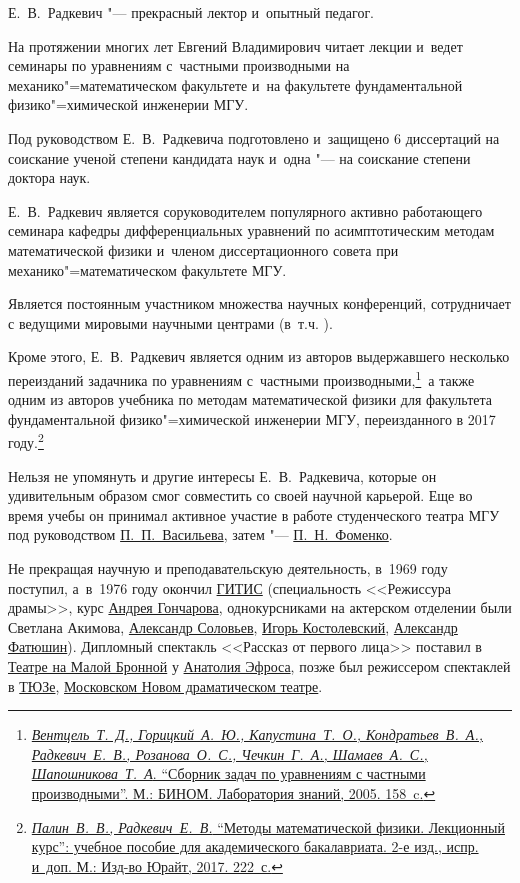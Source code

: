 Е.~В.~Радкевич "--- прекрасный лектор и~опытный педагог. 

На протяжении многих лет Евгений Владимирович читает лекции и~ведет семинары по уравнениям с~частными производными на механико"=математическом факультете и~на факультете фундаментальной физико"=химической инженерии МГУ. 

Под руководством Е.~В.~Радкевича подготовлено и~защищено 6 диссертаций на соискание ученой степени кандидата наук и~одна "--- на соискание степени доктора наук.



Е.~В.~Радкевич является соруководителем популярного активно работающего семинара кафедры дифференциальных уравнений по асимптотическим методам математической физики и~членом диссертационного совета при механико"=математическом факультете МГУ. 

Является постоянным участником множества научных конференций, сотрудничает с ведущими мировыми научными центрами (в~т.ч. ). 

Кроме этого, Е.~В.~Радкевич является одним из авторов выдержавшего несколько переизданий задачника по уравнениям с~частными производными,\footnote{\href{https://istina.msu.ru/publications/book/1826310/}{{\it Вентцель~Т.~Д., Горицкий~А.~Ю., Капустина~Т.~О., Кондратьев~В.~А., Радкевич~Е.~В., Розанова~О.~С., Чечкин~Г.~А., Шамаев~А.~С., Шапошникова~Т.~А}. ``Сборник задач по уравнениям с частными производными''. М.: БИНОМ. Лаборатория знаний, 2005. 158~c.}}\!\!~а также одним из авторов учебника по методам математической физики для факультета фундаментальной физико"=химической инженерии МГУ, переизданного в 2017 году.\footnote{

\href{https://elibrary.ru/item.asp?id=30568002}{{\it Палин~В.~В., Радкевич~Е.~В.} ``Методы математической физики. Лекционный курс'': учебное пособие для академического бакалавриата. 2-е изд., испр. и~доп. М.: Изд-во Юрайт, 2017.  222~с.} }



Нельзя не упомянуть и другие интересы Е.~В.~Радкевича, которые он удивительным образом смог совместить со своей научной карьерой. Еще во время учебы он принимал активное участие в работе студенческого театра МГУ под руководством \href{https://goo.gl/YhM9Eg}{П.~П.~Васильева}, затем "--- \href{https://goo.gl/nB1LPU}{П.~Н.~Фоменко}. 

Не прекращая научную и преподавательскую деятельность, в~1969 году поступил, а~в~1976 году окончил \href{https://goo.gl/DfcJNR}{ГИТИС} (специальность <<Режиссура драмы>>, курс \href{https://goo.gl/HFRLHQ}{Андрея Гончарова}, однокурсниками на актерском отделении были Светлана Акимова, \href{https://goo.gl/a8g3Xm}{Александр Соловьев}, \href{https://goo.gl/VRGfi6}{Игорь Костолевский}, \href{https://goo.gl/oQ89tw}{Александр Фатюшин}). Дипломный спектакль <<Рассказ от первого лица>> поставил в \href{https://goo.gl/mvSV2b}{Театре на Малой Бронной} у \href{https://goo.gl/rTdrBN}{Анатолия Эфроса}, позже был режиссером спектаклей в \href{https://goo.gl/uFGAzt}{ТЮЗе}, \href{https://goo.gl/6WLbvz}{Московском Новом драматическом театре}.



